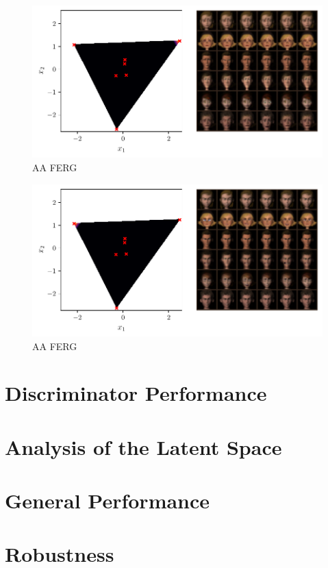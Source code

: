\begin{figure}[htpb]
    \centering
    \includegraphics[width=1\linewidth]{figures/samples/aa_ferg2.pdf}
    \caption{AA FERG}%
    \label{fig:aa_ferg}
\end{figure}

\begin{figure}[htpb]
    \centering
    \includegraphics[width=1\linewidth]{figures/samples/aa_ferg3.pdf}
    \caption{AA FERG}%
    \label{fig:aa_ferg}
\end{figure}


\section{Discriminator Performance}%
\label{sec:discriminator_performance}


\section{Analysis of the Latent Space}%
\label{sec:analysis_of_the_latent_space}


\section{General Performance}%
\label{sec:general_performance}


\section{Robustness}%
\label{sec:robustness}


